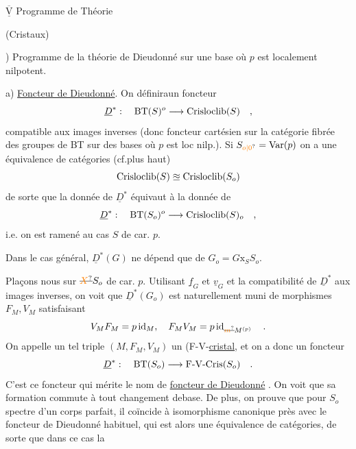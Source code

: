 $\overline{\underline{\mathrm{V}}}$ Programme de  Théorie

(Cristaux)

) Programme de la théorie de Dieudonné sur une base  où $p$ est localement nilpotent.

a) \uline{Foncteur de Dieudonné}. On  définiraun foncteur
\[
\underline{D}^{*}:\quad \mathrm{BT}(S)^o\longrightarrow\mathrm{Crisloclib}(S)\quad,
\]
compatible aux images inverses (donc foncteur cartésien sur la catégorie fibrée des groupes de BT sur des bases où $p$ est loc\deleted{\unsure{,|;}} nilp.). Si $S_{\unsure{o|0}}=\mathrm{Var}(p)$ on a une équivalence de catégories (cf.\qquad plus haut)
\[
\mathrm{Crisloclib}(S)\approxeq\mathrm{Crisloclib}(S_o)
\]
de sorte que la donnée de $\underline{D}^{*}$ équivaut à la donnée de
\[
\underline{D}^{*}:\quad\mathrm{BT}(S_o)^o\longrightarrow\mathrm{Crisloclib}(S)_o\quad,
\]
i.e. on est ramené  au cas $S$ de car. $p$. 

Dans le cas général, $\underline{D}^{*}(G)$ ne dépend que de  $G_o=G\mathbin{\mathrm{x}}_S S_o$.

 Plaçons nous sur $\deleted{\unsure{X}}S_o$ de car. $p$. Utilisant $\underline{f}_G$ et $\underline{v}_G$ et la compatibilité de $\underline{D}^{*}$ aux images inverses, on voit que  $\underline{D}^{*}(G_o)$  est naturellement muni de morphismes $F_M,V_M$ 
satisfaisant
\[
V_M F_M=p\operatorname{id}_M,\quad F_M V_M=p\operatorname{id}_{\deleted{\unsure{m}}M^{(p)}}\quad.
\]
On appelle un tel triple $(M,F_M,V_M)$ un (F-V-\uline{cristal}, et on a donc un foncteur
\[
\underline{D}^{*}:\quad\mathrm{BT}(S_o)\longrightarrow\text{F-V-Cris}(S_o)\quad .
\]
C'est ce foncteur qui mérite le nom de \uline{foncteur de Dieudonné} . On  voit que sa formation commute à tout changement de\handwritten{\inserted{ }}base. De plus, on prouve que pour $S_o$ spectre d'un corps parfait, il coïncide  à isomorphisme canonique près avec le foncteur de Dieudonné habituel, qui est alors une équivalence de catégories, de sorte que dans ce cas la

